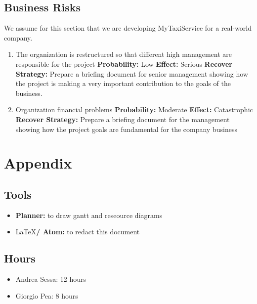 \documentclass[11pt,titlepage]{article} %
\begin{document}
\subsection{Business Risks}
  We assume for this section that we are developing MyTaxiService for a real-world company.\newline
  \begin{enumerate}
   \item The organization is restructured so that different high management are responsible for the project\newline
    \textbf{Probability:} Low\newline
    \textbf{Effect:} Serious\newline
    \textbf{Recover Strategy:} Prepare a briefing document for senior management showing how the project is making a very important contribution to the goals of the business.\newline
   \item Organization financial problems
    \textbf{Probability:} Moderate\newline
    \textbf{Effect:} Catastrophic\newline
    \textbf{Recover Strategy:} Prepare a briefing document for the management showing how the project goals are fundamental for the company business \newline
  \end{enumerate}

\newpage

\section{Appendix}
  	\subsection{Tools}
		\begin{itemize}
			\item \textbf{Planner:} to draw gantt and reseource diagrams
			\item \LaTeX \textbf{/ Atom:} to redact this document
		\end{itemize}

	\subsection{Hours}
		\begin{itemize}
			\item Andrea Sessa: 12 hours
			\item Giorgio Pea: 8 hours
		\end{itemize}
\end{document}
